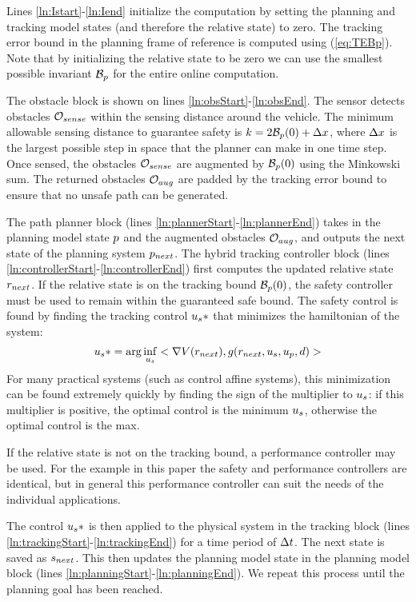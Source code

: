 Lines \ref{ln:Istart}-\ref{ln:Iend} initialize the computation by setting the planning and tracking model states (and therefore the relative state) to zero. The tracking error bound in the planning frame of reference is computed using (\ref{eq:TEBp}). Note that by initializing the relative state to be zero we can use the smallest possible invariant $\mathcal B_p$ for the entire online computation. 

The obstacle block is shown on lines \ref{ln:obsStart}-\ref{ln:obsEnd}. The sensor detects obstacles $\mathcal{O}_{sense}$ within the sensing distance around the vehicle. The minimum allowable sensing distance to guarantee safety is $k = 2\mathcal B_p(0) + \Delta x$, where $\Delta x$ is the largest possible step in space that the planner can make in one time step.  Once sensed, the obstacles $\mathcal{O}_{sense}$ are augmented by $\mathcal B_p(0)$ using the Minkowski sum. The returned obstacles $\mathcal{O}_{aug}$ are padded by the tracking error bound to ensure that no unsafe path can be generated.


 The path planner block (lines \ref{ln:plannerStart}-\ref{ln:plannerEnd}) takes in the planning model state $p$ and the augmented obstacles $\mathcal{O}_{aug}$, and outputs the next state of the planning system $p_{next}$. The hybrid tracking controller block (lines \ref{ln:controllerStart}-\ref{ln:controllerEnd}) first computes the updated relative state $r_{next}$. If the relative state is on the tracking bound $\mathcal B_p(0)$, the safety controller must be used to remain within the guaranteed safe bound. The safety control is found by finding the tracking control $u_s*$ that minimizes the hamiltonian of the system:
\begin{equation}
	u_s* = \arg\inf_{u_s} <\nabla V(r_{next}),g(r_{next},u_s,u_p,d)>
\end{equation}
For many practical systems (such as control affine systems), this minimization can be found extremely quickly by finding the sign of the multiplier to $u_s$: if this multiplier is positive, the optimal control is the minimum $u_s$, otherwise the optimal control is the max.

If the relative state is not on the tracking bound, a performance controller may be used. For the example in this paper the safety and performance controllers are identical, but in general this performance controller can suit the needs of the individual applications.

The control $u_s*$ is then applied to the physical system in the tracking block (lines \ref{ln:trackingStart}-\ref{ln:trackingEnd}) for a time period of $\Delta t$. The next state is saved as $s_{next}$. This then updates the planning model state in the planning model block (lines \ref{ln:planningStart}-\ref{ln:planningEnd}). We repeat this process until the planning goal has been reached.